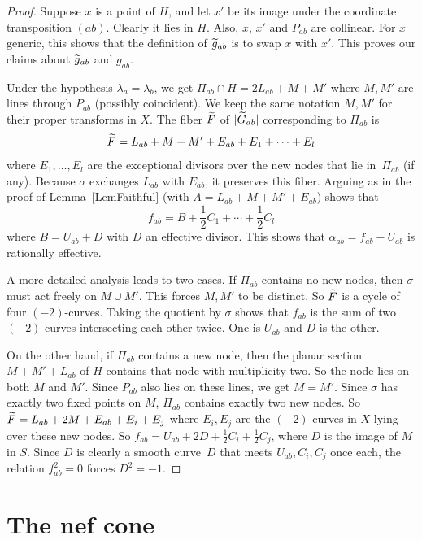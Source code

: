 \documentclass[11pt]{article}
\theoremstyle{definition}
\numberwithin{equation}{section}
\numberwithin{figure}{section}
\numberwithin{table}{section}
\let\oldtilde\tilde
\renewcommand*\tilde[1]{\mathchoice{\widetilde{#1}}{\widetilde{#1}}{\oldtilde{#1}}{\oldtilde{#1}}}
\newcommand*\gtilde{\tilde g}
\newcommand*\Gtilde{\tilde G}
\newcommand*\Ftilde{\tilde F}
\begin{document}
\begin{proof}
Suppose $x$ is a point of $H$, and let $x'$ be its image under the coordinate transposition $(ab)$. Clearly it lies in $H$. Also, $x$, $x'$ and $P_{ab}$ are collinear. For $x$ generic, this shows that the definition of $\gtilde_{ab}$ is to swap $x$ with $x'$. This proves our claims about $\gtilde_{ab}$ and $g_{ab}$.

Under the hypothesis $\lambda_a=\lambda_b$, we get $\Pi_{ab}\cap H=2L_{ab}+M+M'$ where $M,M'$ are lines through $P_{ab}$ (possibly coincident). We keep the same notation $M,M'$ for their proper transforms in $X$. The fiber $\Ftilde$ of $|\Gtilde_{ab}|$ corresponding to $\Pi_{ab}$ is
\begin{equation*}
\Ftilde=L_{ab}+M+M'+E_{ab}+E_1+\cdots+E_l
\end{equation*}
where $E_1,\dots,E_l$ are the exceptional divisors over the new nodes that lie in~$\Pi_{ab}$ (if any). Because $\sigma$ exchanges $L_{ab}$ with $E_{ab}$, it preserves this fiber. Arguing as in the proof of Lemma~\ref{LemFaithful} (with $A=L_{ab}+M+M'+E_{ab}$) shows that
\[
\textstyle f_{ab}=B+\frac12C_1+\cdots+\frac12C_l
\]
where $B=U_{ab}+D$ with $D$ an effective divisor. This shows that $\alpha_{ab}=f_{ab}-U_{ab}$ is rationally effective.

A more detailed analysis leads to two cases. If $\Pi_{ab}$ contains no new nodes, then $\sigma$ must act freely on $M\cup M'$. This forces $M,M'$ to be distinct. So $\Ftilde$ is a cycle of four $(-2)$-curves. Taking the quotient by $\sigma$ shows that $f_{ab}$ is the sum of two $(-2)$-curves intersecting each other twice. One is $U_{ab}$ and $D$ is the other.

On the other hand, if $\Pi_{ab}$ contains a new node, then the planar section $M+M'+L_{ab}$ of $H$ contains that node with multiplicity two. So the node lies on both $M$ and $M'$. Since $P_{ab}$ also lies on these lines, we get $M=M'$. Since $\sigma$ has exactly two fixed points on $M$, $\Pi_{ab}$ contains exactly two new nodes. So $\Ftilde=L_{ab}+2M+E_{ab}+E_i+E_j$ where $E_i,E_j$ are the $(-2)$-curves in $X$ lying over these new nodes. So $f_{ab}=U_{ab}+2D+\frac12 C_i+\frac12 C_j$, where $D$ is the image of $M$ in $S$. Since $D$ is clearly a smooth curve~$D$ that meets $U_{ab},C_i,C_j$ once each, the relation $f_{ab}^2=0$ forces $D^2=-1$.
\end{proof}

\section{The nef cone}\label{SecNef}
\end{document}
